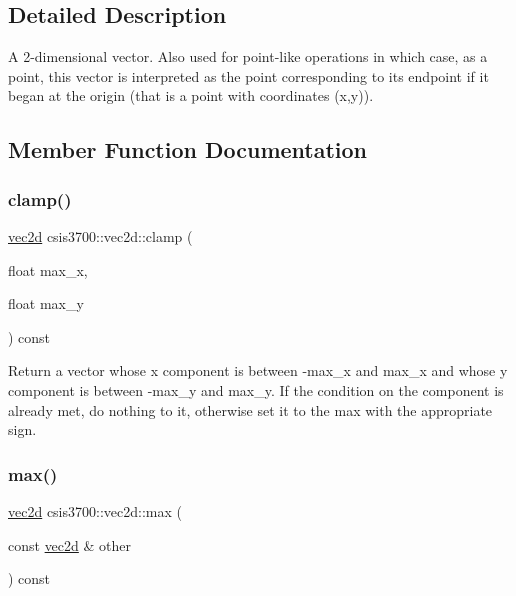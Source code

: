 \subsection{Detailed Description}
A 2-\/dimensional vector. Also used for point-\/like operations in which case, as a point, this vector is interpreted as the point corresponding to its endpoint if it began at the origin (that is a point with coordinates (x,y)). 

\subsection{Member Function Documentation}
\mbox{\label{classcsis3700_1_1vec2d_a73b3a12f9c2ebddb35d6cda11e167964}} 
\subsubsection{\texorpdfstring{clamp()}{clamp()}}
{\footnotesize\ttfamily \hyperlink{classcsis3700_1_1vec2d}{vec2d} csis3700\+::vec2d\+::clamp (\begin{DoxyParamCaption}\item[{float}]{max\+\_\+x,  }\item[{float}]{max\+\_\+y }\end{DoxyParamCaption}) const}

Return a vector whose x component is between -\/max\+\_\+x and max\+\_\+x and whose y component is between -\/max\+\_\+y and max\+\_\+y. If the condition on the component is already met, do nothing to it, otherwise set it to the max with the appropriate sign. \mbox{\label{classcsis3700_1_1vec2d_ac311938a3cf00e5cd919e27493337ed1}} 
\subsubsection{\texorpdfstring{max()}{max()}}
{\footnotesize\ttfamily \hyperlink{classcsis3700_1_1vec2d}{vec2d} csis3700\+::vec2d\+::max (\begin{DoxyParamCaption}\item[{const \hyperlink{classcsis3700_1_1vec2d}{vec2d} \&}]{other }\end{DoxyParamCaption}) const}

